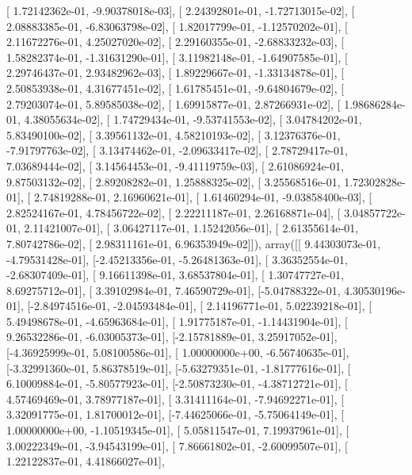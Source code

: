 \documentclass{article}
\begin{document}
       [ 1.72142362e-01, -9.90378018e-03],
       [ 2.24392801e-01, -1.72713015e-02],
       [ 2.08883385e-01, -6.83063798e-02],
       [ 1.82017799e-01, -1.12570202e-01],
       [ 2.11672276e-01,  4.25027020e-02],
       [ 2.29160355e-01, -2.68833232e-03],
       [ 1.58282374e-01, -1.31631290e-01],
       [ 3.11982148e-01, -1.64907585e-01],
       [ 2.29746437e-01,  2.93482962e-03],
       [ 1.89229667e-01, -1.33134878e-01],
       [ 2.50853938e-01,  4.31677451e-02],
       [ 1.61785451e-01, -9.64804679e-02],
       [ 2.79203074e-01,  5.89585038e-02],
       [ 1.69915877e-01,  2.87266931e-02],
       [ 1.98686284e-01,  4.38055634e-02],
       [ 1.74729434e-01, -9.53741553e-02],
       [ 3.04784202e-01,  5.83490100e-02],
       [ 3.39561132e-01,  4.58210193e-02],
       [ 3.12376376e-01, -7.91797763e-02],
       [ 3.13474462e-01, -2.09633417e-02],
       [ 2.78729417e-01,  7.03689444e-02],
       [ 3.14564453e-01, -9.41119759e-03],
       [ 2.61086924e-01,  9.87503132e-02],
       [ 2.89208282e-01,  1.25888325e-02],
       [ 3.25568516e-01,  1.72302828e-01],
       [ 2.74819288e-01,  2.16960621e-01],
       [ 1.61460294e-01, -9.03858400e-03],
       [ 2.82524167e-01,  4.78456722e-02],
       [ 2.22211187e-01,  2.26168871e-04],
       [ 3.04857722e-01,  2.11421007e-01],
       [ 3.06427117e-01,  1.15242056e-01],
       [ 2.61355614e-01,  7.80742786e-02],
       [ 2.98311161e-01,  6.96353949e-02]]), array([[ 9.44303073e-01, -4.79531428e-01],
       [-2.45213356e-01, -5.26481363e-01],
       [ 3.36352554e-01, -2.68307409e-01],
       [ 9.16611398e-01,  3.68537804e-01],
       [ 1.30747727e-01,  8.69275712e-01],
       [ 3.39102984e-01,  7.46590729e-01],
       [-5.04788322e-01,  4.30530196e-01],
       [-2.84974516e-01, -2.04593484e-01],
       [ 2.14196771e-01,  5.02239218e-01],
       [ 5.49498678e-01, -4.65963684e-01],
       [ 1.91775187e-01, -1.14431904e-01],
       [ 9.26532286e-01, -6.03005373e-01],
       [-2.15781889e-01,  3.25917052e-01],
       [-4.36925999e-01,  5.08100586e-01],
       [ 1.00000000e+00, -6.56740635e-01],
       [-3.32991360e-01,  5.86378519e-01],
       [-5.63279351e-01, -1.81777616e-01],
       [ 6.10009884e-01, -5.80577923e-01],
       [-2.50873230e-01, -4.38712721e-01],
       [ 4.57469469e-01,  3.78977187e-01],
       [ 3.31411164e-01, -7.94692271e-01],
       [ 3.32091775e-01,  1.81700012e-01],
       [-7.44625066e-01, -5.75064149e-01],
       [ 1.00000000e+00, -1.10519345e-01],
       [ 5.05811547e-01,  7.19937961e-01],
       [ 3.00222349e-01, -3.94543199e-01],
       [ 7.86661802e-01, -2.60099507e-01],
       [ 1.22122837e-01,  4.41866027e-01],
\end{document}
